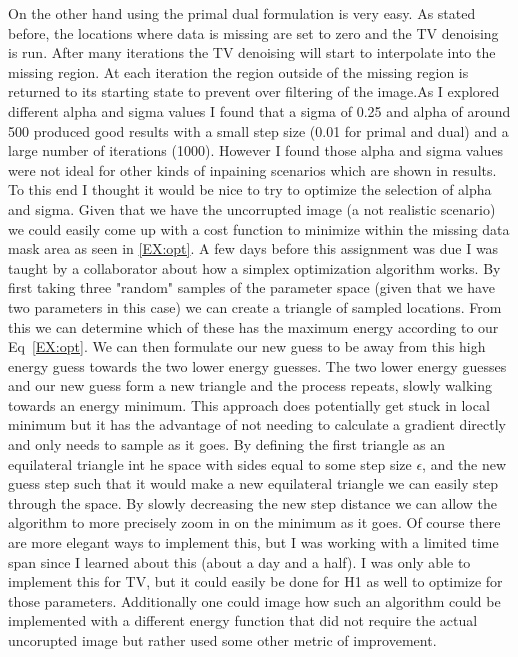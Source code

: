 \documentclass[12pt]{article}
\begin{document}
\par{}
On the other hand using the primal dual formulation is very easy. As stated before, the locations where data is missing are set to zero and the TV denoising is run. After many iterations the TV denoising will start to interpolate into the missing region. At each iteration the region outside of the missing region is returned to its starting state to prevent over filtering of the image.As I explored different alpha and sigma values I found that a sigma of 0.25 and alpha of around 500 produced good results with a small step size (0.01 for primal and dual) and a large number of iterations (1000). However I found those alpha and sigma values were not ideal for other kinds of inpaining scenarios which are shown in results. To this end I thought it would be nice to try to optimize the selection of alpha and sigma. Given that we have the uncorrupted image (a not realistic scenario) we could easily come up with a cost function to minimize within the missing data mask area as seen in \ref{EX:opt}. A few days before this assignment was due I was taught by a collaborator about how a simplex optimization algorithm works. By first taking three "random" samples of the parameter space (given that we have two parameters in this case) we can create a triangle of sampled locations. From this we can determine which of these has the maximum energy according to our Eq~\ref{EX:opt}. We can then formulate our new guess to be away from this high energy guess towards the two lower energy guesses. The two lower energy guesses and our new guess form a new triangle and the process repeats, slowly walking towards an energy minimum. This approach does potentially get stuck in local minimum but it has the advantage of not needing to calculate a gradient directly and only needs to sample as it goes. By defining the first triangle as an equilateral triangle int he space with sides equal to some step size $\epsilon$, and the new guess step such that it would make a new equilateral triangle we can easily step through the space. By slowly decreasing the new step distance we can allow the algorithm to more precisely zoom in on the minimum as it goes. Of course there are more elegant ways to implement this, but I was working with a limited time span since I learned about this (about a day and a half). I was only able to implement this for TV, but it could easily be done for H1 as well to optimize for those parameters. Additionally one could image how such an algorithm could be implemented with a different energy function that did not require the actual uncorupted image but rather used some other metric of improvement.
\end{document}
